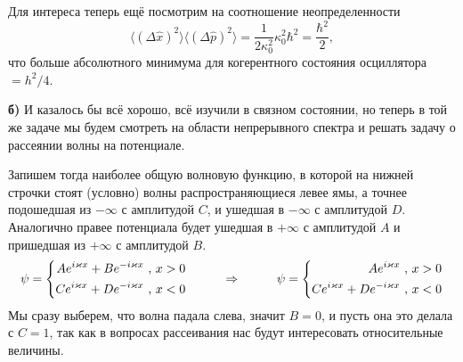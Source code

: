Для интереса теперь ещё посмотрим на соотношение неопределенности
\begin{equation*}
	\langle(\Delta \hat{x})^2\rangle\langle(\Delta \hat{p})^2\rangle = \frac{1}{2 \kappa_0^2} \kappa_0^2 \hbar^2 = \frac{\hbar^2}{2},
\end{equation*}
что больше абсолютного минимума для когерентного состояния осциллятора $ = h^2/4$.

\phantom{42}

\textbf{б)} И казалось бы всё хорошо, всё изучили в связном состоянии, но теперь в той же задаче мы будем смотреть на области непрерывного спектра и решать задачу о рассеянии волны на потенциале.

Запишем тогда наиболее общую волновую функцию, в которой на нижней строчки стоят (условно) волны распространяющиеся левее ямы, а точнее подошедшая из $-\infty$ с амплитудой $C$, и ушедшая в $-\infty$ с амплитудой $D$. Аналогично правее потенциала будет ушедшая в $+\infty$ с амплитудой $A$ и пришедшая из $+\infty$ с амплитудой $B$.
\begin{equation*}
	\psi = \left\{\begin{aligned}
		A e^{i \kappa x} + B e^{- i \kappa x} \ , \ & x >0\\
		C e^{i \kappa x} + D e^{- i \kappa x} \ , \ & x <0
	\end{aligned}\right.
	\hspace{1 cm}
	\Rightarrow
	\hspace{1 cm}
	\psi = \left\{\begin{aligned}
		A e^{i \kappa x}  \ , \ & x >0\\
		C e^{i \kappa x} + D e^{- i \kappa x} \ , \ & x <0
	\end{aligned}\right.
\end{equation*}
Мы сразу выберем, что волна падала слева, значит $B = 0$, и пусть она это делала с $C = 1$, так как в вопросах рассеивания нас будут интересовать относительные величины.

